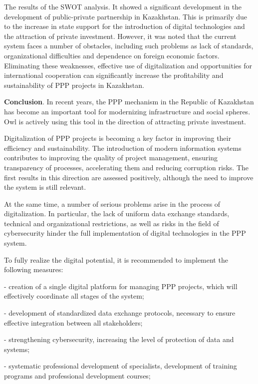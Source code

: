 \begin{multicols}{2}
The results of the SWOT analysis. It showed a significant development in
the development of public-private partnership in Kazakhstan. This is
primarily due to the increase in state support for the introduction of
digital technologies and the attraction of private investment. However,
it was noted that the current system faces a number of obstacles,
including such problems as lack of standards, organizational
difficulties and dependence on foreign economic factors. Eliminating
these weaknesses, effective use of digitalization and opportunities for
international cooperation can significantly increase the profitability
and sustainability of PPP projects in Kazakhstan.

{\bfseries Conclusion}. In recent years, the PPP mechanism in the Republic
of Kazakhstan has become an important tool for modernizing
infrastructure and social spheres. Owl is actively using this tool in
the direction of attracting private investment.

Digitalization of PPP projects is becoming a key factor in improving
their efficiency and sustainability. The introduction of modern
information systems contributes to improving the quality of project
management, ensuring transparency of processes, accelerating them and
reducing corruption risks. The first results in this direction are
assessed positively, although the need to improve the system is still
relevant.

At the same time, a number of serious problems arise in the process of
digitalization. In particular, the lack of uniform data exchange
standards, technical and organizational restrictions, as well as risks
in the field of cybersecurity hinder the full implementation of digital
technologies in the PPP system.

To fully realize the digital potential, it is recommended to implement
the following measures:

- creation of a single digital platform for managing PPP projects, which
will effectively coordinate all stages of the system;

- development of standardized data exchange protocols, necessary to
ensure effective integration between all stakeholders;

- strengthening cybersecurity, increasing the level of protection of
data and systems;

- systematic professional development of specialists, development of
training programs and professional development courses;


\end{multicols}

